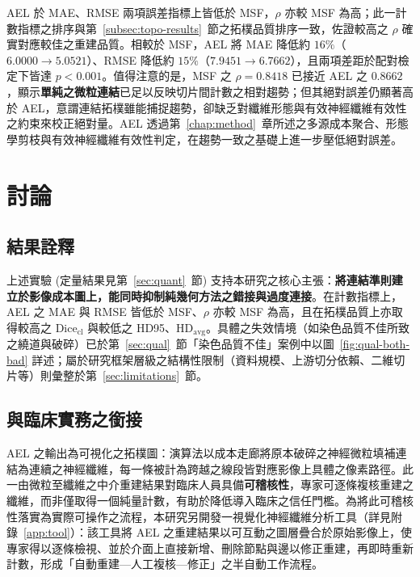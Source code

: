 AEL 於 MAE、RMSE 兩項誤差指標上皆低於 MSF，$\rho$ 亦較 MSF 為高；此一計數指標之排序與第~\ref{subsec:topo-results}~節之拓樸品質排序一致，佐證較高之 $\rho$ 確實對應較佳之重建品質。相較於 MSF，AEL 將 MAE 降低約 $16\%$（$6.0000 \to 5.0521$）、RMSE 降低約 $15\%$（$7.9451 \to 6.7662$），且兩項差距於配對檢定下皆達 $p < 0.001$。值得注意的是，MSF 之 $\rho = 0.8418$ 已接近 AEL 之 $0.8662$，顯示\textbf{單純之微粒連結}已足以反映切片間計數之相對趨勢；但其絕對誤差仍顯著高於 AEL，意謂連結拓樸雖能捕捉趨勢，卻缺乏對纖維形態與有效神經纖維有效性之約束來校正絕對量。AEL 透過第~\ref{chap:method}~章所述之多源成本聚合、形態學剪枝與有效神經纖維有效性判定，在趨勢一致之基礎上進一步壓低絕對誤差。


\section{討論}
\label{sec:discussion}

\subsection{結果詮釋}

上述實驗 (定量結果見第~\ref{sec:quant}~節) 支持本研究之核心主張：\textbf{將連結準則建立於影像成本圖上，能同時抑制純幾何方法之錯接與過度連接}。在計數指標上，AEL 之 MAE 與 RMSE 皆低於 MSF、$\rho$ 亦較 MSF 為高，且在拓樸品質上亦取得較高之 $\text{Dice}_{\text{cl}}$ 與較低之 HD95、$\text{HD}_{\text{avg}}$。具體之失效情境（如染色品質不佳所致之繞道與破碎）已於第~\ref{sec:qual}~節「染色品質不佳」案例中以圖~\ref{fig:qual-both-bad} 詳述；屬於研究框架層級之結構性限制（資料規模、上游切分依賴、二維切片等）則彙整於第~\ref{sec:limitations}~節。

\subsection{與臨床實務之銜接}

AEL 之輸出為可視化之拓樸圖：演算法以成本走廊將原本破碎之神經微粒填補連結為連續之神經纖維，每一條被計為跨越之線段皆對應影像上具體之像素路徑。此一由微粒至纖維之中介重建結果對臨床人員具備\textbf{可稽核性}，專家可逐條複核重建之纖維，而非僅取得一個純量計數，有助於降低導入臨床之信任門檻。為將此可稽核性落實為實際可操作之流程，本研究另開發一視覺化神經纖維分析工具（詳見附錄~\ref{app:tool}）：該工具將 AEL 之重建結果以可互動之圖層疊合於原始影像上，使專家得以逐條檢視、並於介面上直接新增、刪除節點與邊以修正重建，再即時重新計數，形成「自動重建—人工複核—修正」之半自動工作流程。

